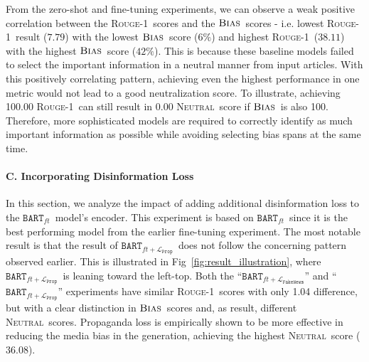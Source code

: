 \documentclass[11pt,a4paper]{article}
\newcommand{\rouge}{{\scshape Rouge-1}}
\newcommand{\all}{$\textsc{Bias}$}
\newcommand{\neutral}{\textsc{Neutral}}
\newcommand{\finetune}{$\texttt{BART}_{ft}$}
\newcommand{\prop}{$\texttt{BART}_{ft+\mathcal{L}_\texttt{Prop}}$}
\newcommand{\fakenews}{$\texttt{BART}_{ft+\mathcal{L}_\texttt{FakeNews}}$}
\begin{document}
From the zero-shot and fine-tuning experiments, we can observe a weak positive correlation between the \rouge~scores and the \all~scores - i.e. lowest \rouge~result ($7.79$) with the lowest \all~score ($6\%$) and highest \rouge~($38.11$) with the highest \all~score ($42\%$).
This is because these baseline models failed to select the important information in a neutral manner from input articles.
With this positively correlating pattern, achieving even the highest performance in one metric would not lead to a good neutralization score. To illustrate, achieving 100.00 \rouge~can still result in 0.00 \neutral~score if \all~is also 100.
Therefore, more sophisticated models are required to correctly identify as much important information as possible while avoiding selecting bias spans at the same time.

\paragraph{C. Incorporating Disinformation Loss}
In this section, we analyze the impact of adding additional disinformation loss to the \finetune~model's encoder. This experiment is based on \finetune~since it is the best performing model from the earlier fine-tuning experiment. 
The most notable result is that the result of \prop~does not follow the concerning pattern observed earlier.
This is illustrated in Fig~\ref{fig:result_illustration}, where \prop~is leaning toward the left-top.
Both the ``\fakenews'' and ``\prop'' experiments have similar \rouge~scores with only 1.04 difference, but with a clear distinction in \all~scores and, as result, different \neutral~scores.
Propaganda loss is empirically shown to be more effective in reducing the media bias in the generation, achieving the highest \neutral~score ($36.08$).
\end{document}
